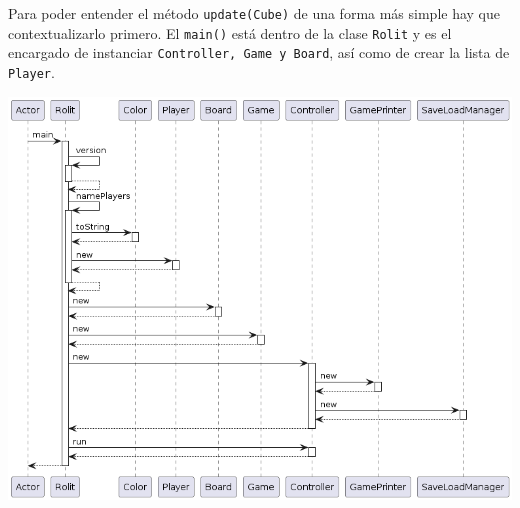 \documentclass[../DocumentoOficial.tex]{subfiles}
\begin{document}
\begin{sprint}[1]
Para poder entender el método \texttt{update(Cube)} de una forma más simple hay que contextualizarlo primero. El \texttt{main()} está dentro de la clase \texttt{Rolit} y es el encargado de instanciar \texttt{Controller, Game y Board}, así como de crear la lista de \texttt{Player}.
\begin{center}
\includegraphics[scale=0.55]{mainS1.png}
\end{center}


\end{sprint}
\end{document}
